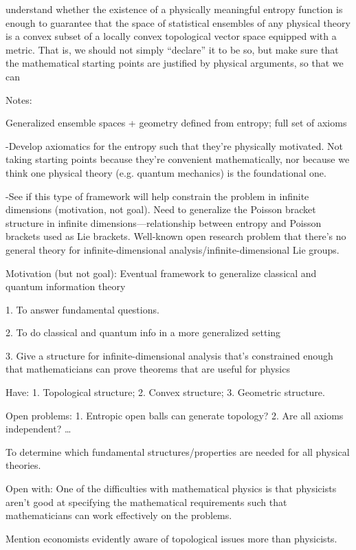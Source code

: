 understand whether the existence of a physically meaningful entropy function is enough to guarantee that the space of statistical ensembles of any physical theory is a convex subset of a locally convex topological vector space equipped with a metric. That is, we should not simply ``declare'' it to be so, but make sure that the mathematical starting points are justified by physical arguments, so that we can 


Notes:

Generalized ensemble spaces + geometry defined from entropy; full set of axioms

-Develop axiomatics for the entropy such that they’re physically motivated.  Not taking starting points because they’re convenient mathematically, nor because we think one physical theory (e.g. quantum mechanics) is the foundational one.

-See if this type of framework will help constrain the problem in infinite dimensions (motivation, not goal).  Need to generalize the Poisson bracket structure in infinite dimensions—relationship between entropy and Poisson brackets used as Lie brackets.  Well-known open research problem that there’s no general theory for infinite-dimensional analysis/infinite-dimensional Lie groups.

Motivation (but not goal): Eventual framework to generalize classical and quantum information theory

1. To answer fundamental questions.

2. To do classical and quantum info in a more generalized setting

3. Give a structure for infinite-dimensional analysis that’s constrained enough that mathematicians can prove theorems that are useful for physics

Have: 1. Topological structure; 2. Convex structure; 3. Geometric structure.  

Open problems: 1. Entropic open balls can generate topology? 2. Are all axioms independent?   …

To determine which fundamental structures/properties are needed for all physical theories.

Open with: One of the difficulties with mathematical physics is that physicists aren’t good at specifying the mathematical requirements such that mathematicians can work effectively on the problems.

Mention economists evidently aware of topological issues more than physicists.



